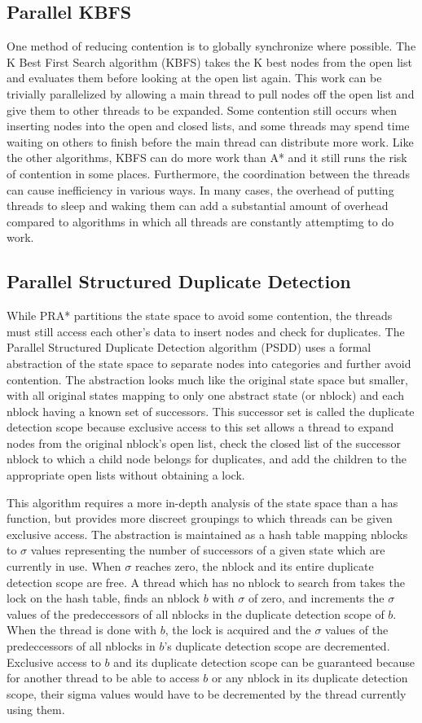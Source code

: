 \documentclass{article}
\begin{document}
\subsection{Parallel KBFS}
One method of reducing contention is to globally synchronize where possible. The K Best First Search algorithm (KBFS) takes the K best nodes from the open list and evaluates them before looking at the open list again. This work can be trivially parallelized by allowing a main thread to pull nodes off the open list and give them to other threads to be expanded. Some contention still occurs when inserting nodes into the open and closed lists, and some threads may spend time waiting on others to finish before the main thread can distribute more work. Like the other algorithms, KBFS can do more work than A* and it still runs the risk of contention in some places. Furthermore, the coordination between the threads can cause inefficiency in various ways. In many cases, the overhead of putting threads to sleep and waking them can add a substantial amount of overhead compared to algorithms in which all threads are constantly attemptimg to do work.
\subsection{Parallel Structured Duplicate Detection}
While PRA* partitions the state space to avoid some contention, the threads must still access each other's data to insert nodes and check for duplicates. The Parallel Structured Duplicate Detection algorithm (PSDD) uses a formal abstraction of the state space to separate nodes into categories and further avoid contention. The abstraction looks much like the original state space but smaller, with all original states mapping to only one abstract state (or nblock) and each nblock having a known set of successors. This successor set is called the duplicate detection scope because exclusive access to this set allows a thread to expand nodes from the original nblock's open list, check the closed list of the successor nblock to which a child node belongs for duplicates, and add the children to the appropriate open lists without obtaining a lock.

This algorithm requires a more in-depth analysis of the state space than a has function, but provides more discreet groupings to which threads can be given exclusive access. The abstraction is maintained as a hash table mapping nblocks to $\sigma$ values representing the number of successors of a given state which are currently in use. When $\sigma$ reaches zero, the nblock and its entire duplicate detection scope are free. A thread which has no nblock to search from takes the lock on the hash table, finds an nblock $b$ with $\sigma$ of zero, and increments the $\sigma$ values of the predeccessors of all nblocks in the duplicate detection scope of $b$. When the thread is done with $b$, the lock is acquired and the $\sigma$ values of the predeccessors of all nblocks in $b$'s duplicate detection scope are decremented. Exclusive access to $b$ and its duplicate detection scope can be guaranteed because for another thread to be able to access $b$ or any nblock in its duplicate detection scope, their sigma values would have to be decremented by the thread currently using them.
\end{document}
